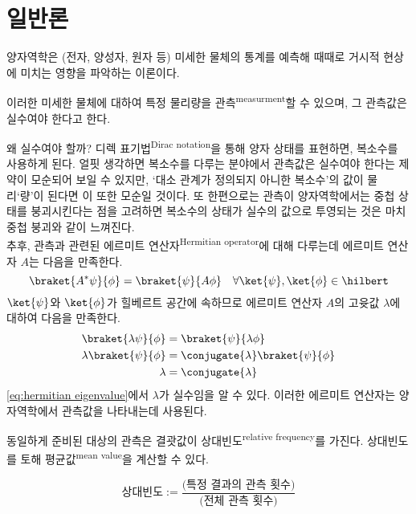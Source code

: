 \documentclass[./note.tex]{subfiles}
\begin{document}
\section{일반론}
\begin{definition}[양자역학]
  양자역학은 (전자, 양성자, 원자 등) 미세한 물체의 통계를 예측해 때때로 거시적 현상에 미치는 영향을 파악하는 이론이다.
\end{definition}
이러한 미세한 물체에 대하여 특정 물리량을 관측\textsuperscript{measurment}할 수 있으며, 그 관측값은 실수여야 한다고 한다.
\begin{note}
  왜 실수여야 할까? 디렉 표기법\textsuperscript{Dirac notation}을 통해 양자 상태를 표현하면, 복소수를 사용하게 된다. 얼핏 생각하면 복소수를 다루는 분야에서 관측값은 실수여야 한다는 제약이 모순되어 보일 수 있지만, `대소 관계가 정의되지 아니한 복소수'의 값이 물리`량'이 된다면 이 또한 모순일 것이다. 또 한편으로는 관측이 양자역학에서는 중첩 상태를 붕괴시킨다는 점을 고려하면 복소수의 상태가 실수의 값으로 투영되는 것은 마치 중첩 붕괴와 같이 느껴진다.\\

  추후, 관측과 관련된 에르미트 연산자\textsuperscript{Hermitian operator}에 대해 다루는데 에르미트 연산자 $A$는 다음을 만족한다.
  \begin{equation}
    \braket{A^*\psi}{\phi} = \braket{\psi}{A\phi} \quad \forall \ket{\psi}, \ket{\phi} \in \hilbert
  \end{equation}
  $\ket{\psi}$와 $\ket{\phi}$가 힐베르트 공간에 속하므로 에르미트 연산자 $A$의 고윳값 $\lambda$에 대하여 다음을 만족한다.
  \begin{align}
    \braket{\lambda\psi}{\phi} &= \braket{\psi}{\lambda\phi} \\
    \lambda\braket{\psi}{\phi} &= \conjugate{\lambda}\braket{\psi}{\phi} \\
    \lambda &= \conjugate{\lambda} \label{eq:hermitian eigenvalue}
  \end{align}
  \eqref{eq:hermitian eigenvalue}에서 $\lambda$가 실수임을 알 수 있다. 이러한 에르미트 연산자는 양자역학에서 관측값을 나타내는데 사용된다.
\end{note}
동일하게 준비된 대상의 관측은 결괏값이 상대빈도\textsuperscript{relative frequency}를 가진다. 상대빈도를 토해 평균값\textsuperscript{mean value}을 계산할 수 있다.
\begin{definition}[상대빈도]
  \begin{equation}
    \text{상대빈도} := \frac{\text{(특정 결과의 관측 횟수)}}{\text{(전체 관측 횟수)}}
  \end{equation}
\end{definition}
\end{document}
